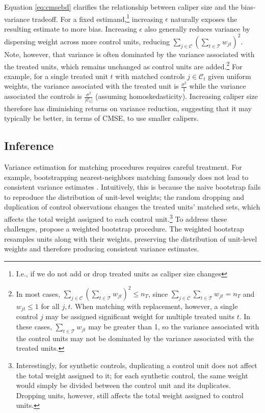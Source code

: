 \documentclass{article}
\newcommand{\Ct}{\mathcal{C}_{t}}
\begin{document}
Equation \ref{eq:cmsebd} clarifies the relationship between caliper size and the bias-variance tradeoff.
For a fixed estimand,\footnote{I.e., if we do not add or drop treated units as caliper size changes} increasing $\epsilon$ naturally exposes the resulting estimate to more bias.
Increasing $\epsilon$ also generally reduces variance by dispersing weight across more control units, reducing $\sum_{j \in \mathcal{C}} (\sum_{t \in \mathcal{T}} w_{jt})^2$.
Note, however, that variance is often dominated by the variance associated with the treated units, which remains unchanged as control units are added.\footnote{In most cases, $\sum_{j \in \mathcal{C}} (\sum_{t \in \mathcal{T}} w_{jt})^2 \leq n_T$, since $\sum_{j \in \mathcal{C}} \sum_{t \in \mathcal{T}} w_{jt} = n_T$ and $w_{jt} \leq 1$ for all $j, t$.
When matching with replacement, however, a single control $j$ may be assigned significant weight for multiple treated units $t$.
In these cases, $\sum_{t \in \mathcal{T}} w_{jt}$ may be greater than 1, so the variance associated with the control units may not be dominated by the variance associated with the treated units.}
For example, for a single treated unit $t$ with matched controls $j \in \Ct$ given uniform weights, the variance associated with the treated unit is
$\frac{\sigma^2}{1}$ while the variance associated the controls is $\frac{\sigma^2}{|\Ct|}$ (assuming homoskedasticity).
Increasing caliper size therefore has diminishing returns on variance reduction, suggesting that it may typically be better, in terms of CMSE, to use smaller calipers.


\subsection{Inference}


Variance estimation for matching procedures requires careful treatment.
For example, bootstrapping nearest-neighbors matching famously does not lead to consistent variance estimates \citep{abadie2008failure}.
Intuitively, this is because the naive bootstrap fails to reproduce the distribution of unit-level weights;
the random dropping and duplication of control observations changes the treated units' matched sets, which affects the total weight assigned to each control unit.\footnote{Interestingly, for synthetic controls, duplicating a control unit does not affect the total weight assigned to it; for each synthetic control, the same weight would simply be divided between the control unit and its duplicates. Dropping units, however, still affects the total weight assigned to control units.}
To address these challenges, \citet{otsu2017bootstrap} propose a weighted bootstrap procedure.
The weighted bootstrap resamples units along with their weights, preserving the distribution of unit-level weights and therefore producing consistent variance estimates.
\end{document}
